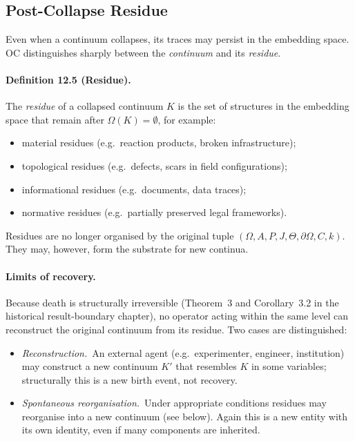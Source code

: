 \subsection{Post-Collapse Residue}

Even when a continuum collapses, its traces may persist in the embedding
space. OC distinguishes sharply between the \emph{continuum} and its
\emph{residue}.

\paragraph{Definition 12.5 (Residue).}
The \emph{residue} of a collapsed continuum \(K\) is the set of structures in
the embedding space that remain after \(\Omega(K)=\emptyset\), for example:
\begin{itemize}
  \item material residues (e.g.\ reaction products, broken infrastructure);
  \item topological residues (e.g.\ defects, scars in field configurations);
  \item informational residues (e.g.\ documents, data traces);
  \item normative residues (e.g.\ partially preserved legal frameworks).
\end{itemize}

Residues are no longer organised by the original tuple
\((\Omega,A,P,J,\Theta,\partial\Omega,C,k)\). They may, however, form the
substrate for new continua.

\paragraph{Limits of recovery.}
Because death is structurally irreversible
(Theorem~3 and Corollary~3.2 in the historical result-boundary chapter), no operator acting
within the same level can reconstruct the original continuum from its
residue. Two cases are distinguished:
\begin{itemize}
  \item \emph{Reconstruction.}\ 
        An external agent (e.g.\ experimenter, engineer, institution) may
        construct a new continuum \(K'\) that resembles \(K\) in some
        variables; structurally this is a new birth event, not recovery.
  \item \emph{Spontaneous reorganisation.}\ 
        Under appropriate conditions residues may reorganise into a new
        continuum (see below). Again this is a new entity with its own
        identity, even if many components are inherited.
\end{itemize}

